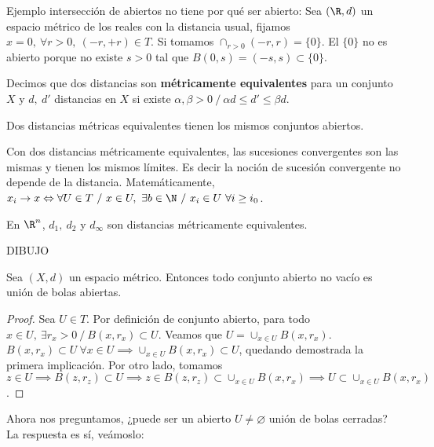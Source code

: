 \begin{exmp}
  Ejemplo intersección de abiertos no  tiene por qué ser abierto:
  Sea $(\R,d)$ un espacio métrico de los reales con la distancia usual, fijamos $x=0,\ \forall r>0,\ (-r,+r) \in T$. Si tomamos $\cap_{r>0}(-r,r)=\{0\}$. El $\{0\}$ no es abierto porque no existe $s>0$ tal que $B(0,s)=(-s,s) \subset \{0\}$.
\end{exmp}

\begin{ndef}
  Decimos que dos distancias son \textbf{métricamente equivalentes} para un conjunto $X$ y $d,\ d'$ distancias en $X$ si existe $\alpha,\beta>0\ /\ \alpha d \leq d' \leq \beta d$.
\end{ndef}
\begin{properties}
  Dos distancias métricas equivalentes tienen los mismos conjuntos abiertos.
\end{properties}
\begin{properties}
  Con dos distancias métricamente equivalentes, las sucesiones convergentes son las mismas y tienen los mismos límites. Es decir la noción de sucesión convergente no depende de la distancia. Matemáticamente,
  $x_i \to x \Leftrightarrow \forall U \in T\ /\ x\in U,\ \exists b \in \N\ /\ x_i \in U\ \forall i \geq i_0$.
\end{properties}
\begin{exmp}
  En $\R^n$, $d_1,\ d_2$ y $d_\infty$ son distancias métricamente equivalentes.
\end{exmp}
DIBUJO

\begin{nprop}
  Sea $(X,d)$ un espacio métrico. Entonces todo conjunto abierto no vacío es unión de bolas abiertas.
\end{nprop}
\begin{proof}
  Sea $U \in T$. Por definición de conjunto abierto, para todo $x \in U,\ \exists r_x>0\ /\ B(x,r_x) \subset U$. Veamos que $U=\cup_{x \in U}B(x,r_x).$ \\ $B(x,r_x) \subset U\ \forall x\in U \implies \cup_{x\in U}B(x,r_x) \subset U$, quedando demostrada la primera implicación. Por otro lado, tomamos $z \in U \implies B(z,r_z) \subset U \implies z \in B(z,r_z) \subset \cup_{x \in U}B(x,r_x) \implies U \subset \cup_{x \in U}B(x,r_x)$.
\end{proof}

Ahora nos preguntamos, ¿puede ser un abierto $U \neq \varnothing $ unión de bolas cerradas? La respuesta es sí,  veámoslo: \\

